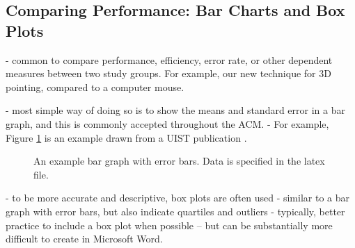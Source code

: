 \subsection{Comparing Performance: Bar Charts and Box Plots}

- common to compare performance, efficiency, error rate, or other dependent measures between two study groups. For example, our new technique for 3D pointing, compared to a computer mouse. 

- most simple way of doing so is to show the means and standard error in a bar graph, and this is commonly accepted throughout the ACM. 
- For example, Figure \ref{bargraph} is an example drawn from a UIST publication \citep{REF}.


\begin{figure}
\caption{An example bar graph with error bars. Data is specified in the latex file.}
\label{bargraph}
\end{figure}


- to be more accurate and descriptive, box plots are often used
- similar to a bar graph with error bars, but also indicate quartiles and outliers 
- typically, better practice to include a box plot when possible -- but can be substantially more difficult to create in Microsoft Word. 




